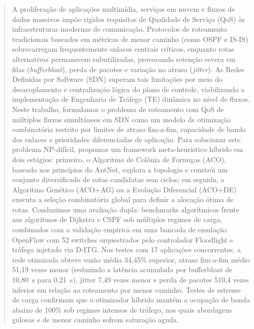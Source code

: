\documentclass[journal]{IEEEtran}
\begin{document}
\begin{abstract}
A prolifera\c{c}\~{a}o de aplica\c{c}\~{o}es multim\'{i}dia, servi\c{c}os em nuvem e fluxos de dados massivos imp\~{o}e r\'{i}gidos requisitos de Qualidade de Servi\c{c}o (QoS) \`{a}s infraestruturas modernas de comunica\c{c}\~{a}o. Protocolos de roteamento tradicionais baseados em m\'{e}tricas de menor caminho (como OSPF e IS-IS) sobrecarregam frequentemente enlaces centrais cr\'{i}ticos, enquanto rotas alternativas permanecem subutilizadas, provocando reten\c{c}\~{a}o severa em filas (\emph{bufferbloat}), perda de pacotes e varia\c{c}\~{a}o no atraso (\emph{jitter}). As Redes Definidas por Software (SDN) superam tais limita\c{c}\~{o}es por meio do desacoplamento e centraliza\c{c}\~{a}o l\'{o}gica do plano de controle, viabilizando a implementa\c{c}\~{a}o de Engenharia de Tr\'{a}fego (TE) dinâmica no n\'{i}vel de fluxos. Neste trabalho, formulamos o problema de roteamento com QoS de m\'{u}ltiplos fluxos simult\^{a}neos em SDN como um modelo de otimiza\c{c}\~{a}o combinat\'{o}ria restrito por limites de atraso fim-a-fim, capacidade de banda dos enlaces e prioridades diferenciadas de aplica\c{c}\~{a}o. Para solucionar este problema NP-dif\'{i}cil, propomos um framework meta-heur\'{i}stico h\'{i}brido em dois est\'{a}gios: primeiro, o Algoritmo de Col\^{o}nia de Formigas (ACO), baseado nos princ\'{i}pios do AntNet, explora a topologia e constr\'{o}i um conjunto diversificado de rotas candidatas sem ciclos; em seguida, o Algoritmo Gen\'{e}tico (ACO$+$AG) ou a Evolu\c{c}\~{a}o Diferencial (ACO$+$DE) executa a sele\c{c}\~{a}o combinat\'{o}ria global para definir a aloca\c{c}\~{a}o \'{o}tima de rotas. Conduzimos uma avalia\c{c}\~{a}o dupla: benchmarks algor\'{i}tmicos frente aos algoritmos de Dijkstra e CSPF sob m\'{u}ltiplos regimes de carga, combinados com a valida\c{c}\~{a}o emp\'{i}rica em uma bancada de emula\c{c}\~{a}o OpenFlow com 52 switches orquestrados pelo controlador Floodlight e tr\'{a}fego injetado via D-ITG. Nos testes com 17 aplica\c{c}\~{o}es concorrentes, a rede otimizada obteve vaz\~{a}o m\'{e}dia 34,45\% superior, atraso fim-a-fim m\'{e}dio 51,19 vezes menor (reduzindo a lat\^{e}ncia acumulada por bufferbloat de 10,80~s para 0,21~s), jitter 7,49 vezes menor e perda de pacotes 510,4 vezes inferior em rela\c{c}\~{a}o ao roteamento por menor caminho. Testes de estresse de carga confirmam que o otimizador h\'{i}brido mant\'{e}m a ocupa\c{c}\~{a}o de banda abaixo de 100\% sob regimes intensos de tr\'{a}fego, nos quais abordagens gulosas e de menor caminho sofrem satura\c{c}\~{a}o aguda.
\end{abstract}
\end{document}
